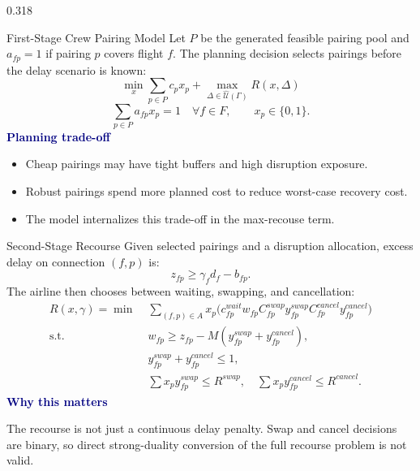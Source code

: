 \documentclass[final]{beamer}
\newcommand{\tightitem}{\setlength{\itemsep}{0.10em}\setlength{\parsep}{0pt}\setlength{\topsep}{0pt}}
\newcommand{\minihead}[1]{\vspace{0.12cm}\textbf{\textcolor{navy}{#1}}\par}
\newcommand{\eqsmall}[1]{\begingroup\scriptsize #1\endgroup}
\begin{document}
\begin{frame}[t]
\begin{minipage}[t]{0.968\textwidth}
\begin{columns}[t,totalwidth=\linewidth]
\begin{column}{0.318\linewidth}
\begin{block}{First-Stage Crew Pairing Model}
Let \(P\) be the generated feasible pairing pool and \(a_{fp}=1\) if pairing \(p\) covers flight \(f\). The planning decision selects pairings before the delay scenario is known:
\eqsmall{
\[
\min_x \sum_{p\in P}c_p x_p+
\max_{\Delta\in\widehat{\mathcal U}(\Gamma)}R(x,\Delta)
\]
\[
\sum_{p\in P}a_{fp}x_p=1\quad \forall f\in F,\qquad x_p\in\{0,1\}.
\]
}
\minihead{Planning trade-off}
\begin{itemize}\tightitem
  \item Cheap pairings may have tight buffers and high disruption exposure.
  \item Robust pairings spend more planned cost to reduce worst-case recovery cost.
  \item The model internalizes this trade-off in the max-recouse term.
\end{itemize}
\end{block}

\begin{block}{Second-Stage Recourse}
Given selected pairings and a disruption allocation, excess delay on connection \((f,p)\) is:
\eqsmall{
\[
z_{fp}\geq \gamma_f d_f-b_{fp}.
\]
}
The airline then chooses between waiting, swapping, and cancellation:
\eqsmall{
\[
\begin{aligned}
R(x,\gamma)=\min\;&
\sum_{(f,p)\in A}x_p\big(
c^{wait}_{fp}w_{fp}
C^{swap}_{fp}y^{swap}_{fp}
C^{cancel}_{fp}y^{cancel}_{fp}\big)\\
\text{s.t. }&
w_{fp}\geq z_{fp}-M(y^{swap}_{fp}+y^{cancel}_{fp}),\\
&y^{swap}_{fp}+y^{cancel}_{fp}\leq 1,\\
&\sum x_p y^{swap}_{fp}\leq R^{swap},\quad
\sum x_p y^{cancel}_{fp}\leq R^{cancel}.
\end{aligned}
\]
}
\minihead{Why this matters}
The recourse is not just a continuous delay penalty. Swap and cancel decisions are binary, so direct strong-duality conversion of the full recourse problem is not valid.
\end{block}


\end{column}
\end{columns}
\end{minipage}
\end{frame}
\end{document}
